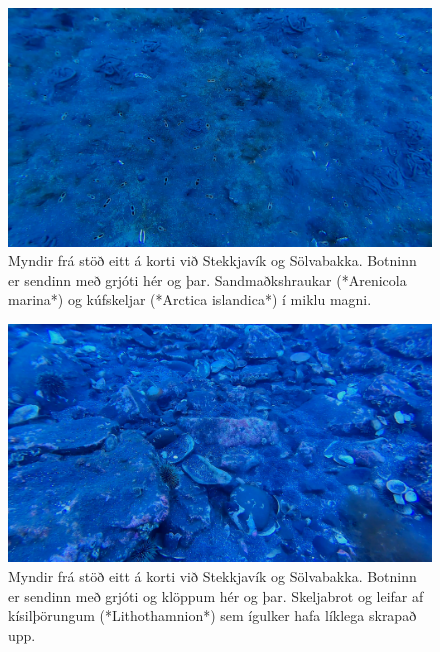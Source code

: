\documentclass[icelandic,]{book}
\begin{document}
\begin{figure}

{\centering \includegraphics[width=1\linewidth]{skjol/skogar/sk2/stodvar/st2/sk2-st2} 

}

\caption{Myndir frá stöð eitt á korti við Stekkjavík og Sölvabakka. Botninn er sendinn með grjóti hér og þar. Sandmaðkshraukar (*Arenicola marina*) og kúfskeljar (*Arctica islandica*) í miklu magni.}\label{fig:mynd-sk-tvo-stod-tvo}
\end{figure}

\begin{figure}

{\centering \includegraphics[width=1\linewidth]{skjol/skogar/sk2/stodvar/st2/sk2-st2B} 

}

\caption{Myndir frá stöð eitt á korti við Stekkjavík og Sölvabakka. Botninn er sendinn með grjóti og klöppum hér og þar. Skeljabrot og leifar af kísilþörungum (*Lithothamnion*) sem ígulker hafa líklega skrapað upp.}\label{fig:mynd-sk-tvo-stod-tvoB}
\end{figure}
\end{document}
